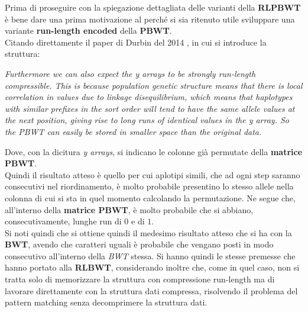 Prima di proseguire con la spiegazione dettagliata delle varianti della
\textbf{RLPBWT} è bene dare 
una prima motivazione al perché si sia ritenuto utile sviluppare una variante
\textbf{run-length encoded} della \textbf{PBWT}.\\
Citando direttamente il paper di Durbin del 2014 \cite{pbwt}, in cui si
introduce la struttura:
\begin{center}
  \textit{Furthermore we can also expect the y arrays to be strongly run-length
    compressible. This is because population genetic structure means that there
    is local correlation in values due to linkage disequilibrium, which means
    that haplotypes with similar prefixes in the sort order will tend to have
    the same allele values at the next position, giving rise to long runs of
    identical values in the y array. So the PBWT can easily be stored in smaller
    space than the original data.} 
\end{center}
Dove, con la dicitura \textit{y arrays}, si indicano le colonne già permutate
della \textbf{matrice PBWT}.\\
Quindi il risultato atteso è quello per cui aplotipi simili, che ad ogni step
saranno consecutivi nel riordinamento, è molto probabile presentino lo stesso
allele nella colonna di cui si sta in quel momento calcolando la
permutazione. Ne segue che, all'interno della \textbf{matrice PBWT}, è molto
probabile che si abbiano, consecutivamente, lunghe run di $0$ e di $1$.\\
Si noti quindi che si ottiene quindi il medesimo risultato atteso che si ha con
la \textbf{BWT}, avendo che caratteri uguali è probabile che vengano posti in
modo consecutivo all'interno della \textit{BWT} stessa. Si hanno quindi le
stesse premesse che hanno portato alla \textbf{RLBWT}, considerando inoltre che,
come in quel caso, non si tratta solo di memorizzare la struttura con
compressione run-length ma di lavorare direttamente con la struttura dati
compressa, risolvendo il problema del pattern matching senza decomprimere la
struttura dati.
